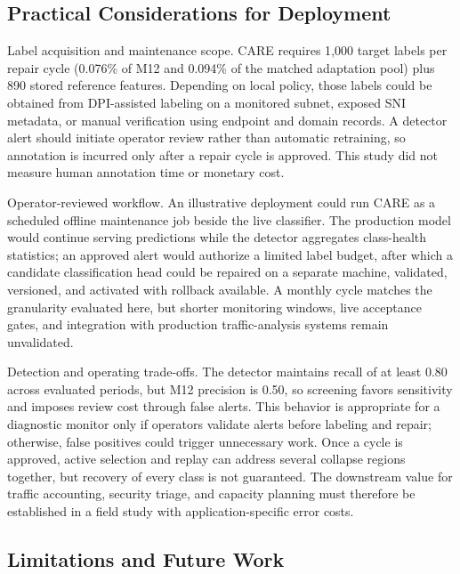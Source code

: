 \documentclass[preprint,12pt,authoryear]{elsarticle}
\newcommand{\ours}{CARE}  %
\begin{document}
\subsection{Practical Considerations for Deployment}
\label{sec:discussion_deployment}

Label acquisition and maintenance scope.
\ours{} requires 1{,}000 target labels per repair cycle (0.076\% of M12 and 0.094\% of the matched adaptation pool) plus 890 stored reference features. Depending on local policy, those labels could be obtained from DPI-assisted labeling on a monitored subnet, exposed SNI metadata, or manual verification using endpoint and domain records. A detector alert should initiate operator review rather than automatic retraining, so annotation is incurred only after a repair cycle is approved. This study did not measure human annotation time or monetary cost.

Operator-reviewed workflow.
An illustrative deployment could run \ours{} as a scheduled offline maintenance job beside the live classifier. The production model would continue serving predictions while the detector aggregates class-health statistics; an approved alert would authorize a limited label budget, after which a candidate classification head could be repaired on a separate machine, validated, versioned, and activated with rollback available. A monthly cycle matches the granularity evaluated here, but shorter monitoring windows, live acceptance gates, and integration with production traffic-analysis systems remain unvalidated.

Detection and operating trade-offs.
The detector maintains recall of at least 0.80 across evaluated periods, but M12 precision is 0.50, so screening favors sensitivity and imposes review cost through false alerts. This behavior is appropriate for a diagnostic monitor only if operators validate alerts before labeling and repair; otherwise, false positives could trigger unnecessary work. Once a cycle is approved, active selection and replay can address several collapse regions together, but recovery of every class is not guaranteed. The downstream value for traffic accounting, security triage, and capacity planning must therefore be established in a field study with application-specific error costs.

\subsection{Limitations and Future Work}
\label{sec:discussion_limitations}
\end{document}
